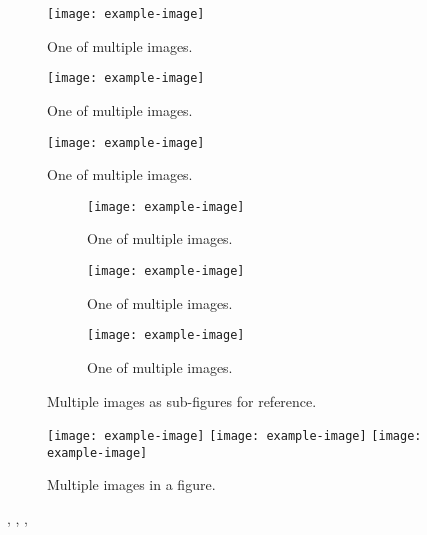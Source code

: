 \documentclass{article}
\begin{document}
\begin{figure}[ht]
    \centering
    \begin{minipage}{0.32\textwidth}
        \texttt{[image: example-image]}
        \caption{One of multiple images.}
        \label{fig:multiple-images-1}
    \end{minipage}
    \hfill
    \begin{minipage}{0.32\textwidth}
        \texttt{[image: example-image]}
        \caption{One of multiple images.}
        \label{fig:multiple-images-2}
    \end{minipage}
    \hfill
    \begin{minipage}{0.32\textwidth}
        \texttt{[image: example-image]}
        \caption{One of multiple images.}
        \label{fig:multiple-images-3}
    \end{minipage}
\end{figure}

\begin{figure}[ht]
    \centering
    \begin{subfigure}{0.32\textwidth}
        \texttt{[image: example-image]}
        \caption{One of multiple images.}
        \label{fig:multiple-images-4}
    \end{subfigure}
    \hfill
    \begin{subfigure}{0.32\textwidth}
        \texttt{[image: example-image]}
        \caption{One of multiple images.}
        \label{fig:multiple-images-5}
    \end{subfigure}
    \hfill
    \begin{subfigure}{0.32\textwidth}
        \texttt{[image: example-image]}
        \caption{One of multiple images.}
        \label{fig:multiple-images-6}
    \end{subfigure}
    \caption{Multiple images as sub-figures for reference.}
\end{figure}

\begin{figure}[ht]
    \centering
    \texttt{[image: example-image]}
    \hfill
    \texttt{[image: example-image]}
    \hfill
    \texttt{[image: example-image]}
    \caption{Multiple images in a figure.}
    \label{fig:multiple-images}
\end{figure}



, , , 
\end{document}
